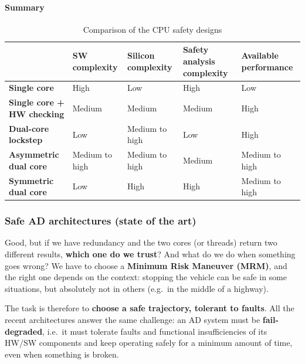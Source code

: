 \paragraph{Summary}
\begin{table}[H]
    \centering
    \begin{tabular}{|p{4.2cm}|>{\centering\arraybackslash}p{2.6cm}|>{\centering\arraybackslash}p{2.6cm}|>{\centering\arraybackslash}p{2.6cm}|>{\centering\arraybackslash}p{2.6cm}|}
        \hline
         & \textbf{SW complexity} & \textbf{Silicon complexity} & \textbf{Safety analysis complexity} & \textbf{Available performance} \\
        \hline
        \textbf{Single core}                & High   & Low            & High   & Low \\
        \hline
        \textbf{Single core + HW checking}  & Medium & Medium         & Medium & High \\
        \hline
        \textbf{Dual-core lockstep}         & Low    & Medium to high & Low    & High \\
        \hline
        \textbf{Asymmetric dual core}       & Medium to high & Medium to high & Medium & Medium to high \\
        \hline
        \textbf{Symmetric dual core}        & Low    & High           & High   & Medium to high \\
        \hline
    \end{tabular}
    \caption{Comparison of the CPU safety designs}
\end{table}

\subsubsection{Safe AD architectures (state of the art)}
Good, but if we have redundancy and the two cores (or threads) return two different results, \textbf{which one do we trust}?
And what do we do when something goes wrong? We have to choose a \textbf{Minimum Risk Maneuver (MRM)}, and the right one depends on the context: stopping the vehicle can be safe in some situations, but absolutely not in others (e.g.\ in the middle of a highway).

The task is therefore to \textbf{choose a safe trajectory, tolerant to faults}.
All the recent architectures answer the same challenge: an AD system must be \textbf{fail-degraded}, i.e.\ it must tolerate faults and functional insufficiencies of its HW/SW components and keep operating safely for a minimum amount of time, even when something is broken.

